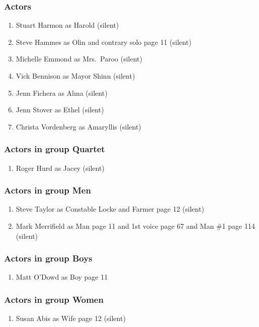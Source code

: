 \subsubsection{Actors}
\begin{enumerate}
\item Stuart Harmon as Harold (silent)
\item Steve Hammes as Olin and contrary solo page 11 (silent)
\item Michelle Emmond as Mrs.~Paroo (silent)
\item Vick Bennison as Mayor Shinn (silent)
\item Jenn Fichera as Alma (silent)
\item Jenn Stover as Ethel (silent)
\item Christa Vordenberg as Amaryllis (silent)
\end{enumerate}
\subsubsection{Actors in group Quartet}
\begin{enumerate}
\item Roger Hurd as Jacey (silent)
\end{enumerate}
\subsubsection{Actors in group Men}
\begin{enumerate}
\item Steve Taylor as Constable Locke and Farmer page 12 (silent)
\item Mark Merrifield as Man page 11 and 1st voice page 67 and Man \#1 page 114 (silent)
\end{enumerate}
\subsubsection{Actors in group Boys}
\begin{enumerate}
\item Matt O'Dowd as Boy page 11
\end{enumerate}
\subsubsection{Actors in group Women}
\begin{enumerate}
\item Susan Abis as Wife page 12 (silent)
\end{enumerate}

